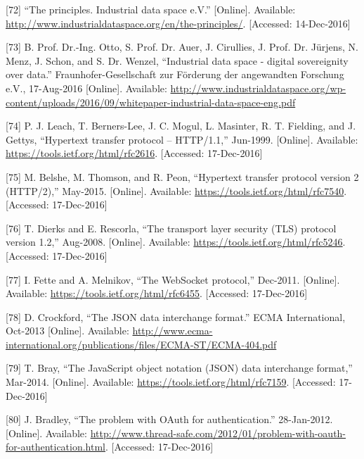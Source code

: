 \documentclass[12pt,english,a4paper,titlepage,cleardoublepage=empty,dottedtoc]{report}
\begin{document}
\hypertarget{ref-web_industrial-data-space}{}
{[}72{]} ``The principles. Industrial data space e.V.'' {[}Online{]}.
Available: \url{http://www.industrialdataspace.org/en/the-principles/}.
{[}Accessed: 14-Dec-2016{]}

\hypertarget{ref-whitepaper_2016_industrial-data-space}{}
{[}73{]} B. Prof. Dr.-Ing. Otto, S. Prof. Dr. Auer, J. Cirullies, J.
Prof. Dr. Jürjens, N. Menz, J. Schon, and S. Dr. Wenzel, ``Industrial
data space - digital sovereignity over data.'' Fraunhofer-Gesellschaft
zur Förderung der angewandten Forschung e.V., 17-Aug-2016 {[}Online{]}.
Available:
\url{http://www.industrialdataspace.org/wp-content/uploads/2016/09/whitepaper-industrial-data-space-eng.pdf}

\hypertarget{ref-web_spec_http1}{}
{[}74{]} P. J. Leach, T. Berners-Lee, J. C. Mogul, L. Masinter, R. T.
Fielding, and J. Gettys, ``Hypertext transfer protocol -- HTTP/1.1,''
Jun-1999. {[}Online{]}. Available:
\url{https://tools.ietf.org/html/rfc2616}. {[}Accessed: 17-Dec-2016{]}

\hypertarget{ref-web_spec_http2}{}
{[}75{]} M. Belshe, M. Thomson, and R. Peon, ``Hypertext transfer
protocol version 2 (HTTP/2),'' May-2015. {[}Online{]}. Available:
\url{https://tools.ietf.org/html/rfc7540}. {[}Accessed: 17-Dec-2016{]}

\hypertarget{ref-web_spec_tls}{}
{[}76{]} T. Dierks and E. Rescorla, ``The transport layer security (TLS)
protocol version 1.2,'' Aug-2008. {[}Online{]}. Available:
\url{https://tools.ietf.org/html/rfc5246}. {[}Accessed: 17-Dec-2016{]}

\hypertarget{ref-web_spec_websockets}{}
{[}77{]} I. Fette and A. Melnikov, ``The WebSocket protocol,'' Dec-2011.
{[}Online{]}. Available: \url{https://tools.ietf.org/html/rfc6455}.
{[}Accessed: 17-Dec-2016{]}

\hypertarget{ref-web_spec_json}{}
{[}78{]} D. Crockford, ``The JSON data interchange format.'' ECMA
International, Oct-2013 {[}Online{]}. Available:
\url{http://www.ecma-international.org/publications/files/ECMA-ST/ECMA-404.pdf}

\hypertarget{ref-web_rfc_json}{}
{[}79{]} T. Bray, ``The JavaScript object notation (JSON) data
interchange format,'' Mar-2014. {[}Online{]}. Available:
\url{https://tools.ietf.org/html/rfc7159}. {[}Accessed: 17-Dec-2016{]}

\hypertarget{ref-web_2012_problem-with-oauth-for-authentication}{}
{[}80{]} J. Bradley, ``The problem with OAuth for authentication.''
28-Jan-2012. {[}Online{]}. Available:
\url{http://www.thread-safe.com/2012/01/problem-with-oauth-for-authentication.html}.
{[}Accessed: 17-Dec-2016{]}
\end{document}
